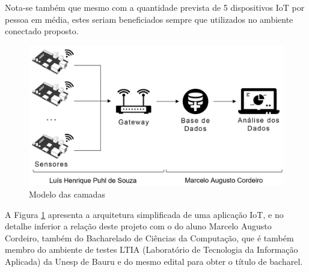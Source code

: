 Nota-se também que mesmo com a quantidade prevista de 5 dispositivos IoT por
pessoa em média, estes seriam beneficiados sempre que utilizados no ambiente
conectado proposto.

\begin{figure}[htb]
	\caption{\label{fig-projeto}Modelo das camadas }
	\begin{center}
		\includegraphics[width=1\textwidth]{012-justificativa/img/projeto.jpg}
	\end{center}
\end{figure}

A Figura \ref{fig-projeto} apresenta a arquitetura simplificada de uma aplicação
IoT, e no detalhe inferior a relação deste projeto com o do aluno Marcelo Augusto
Cordeiro, também do Bacharelado de Ciências da Computação, que é também membro do
ambiente de testes LTIA (Laboratório de Tecnologia da Informação Aplicada) da Unesp de Bauru
e do mesmo edital para obter o título de bacharel.
